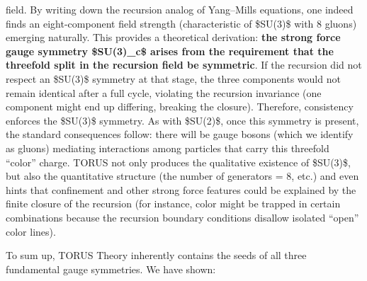 \documentclass[
]{article}
\begin{document}
{\begin{itemize}
  field\hspace{0pt}. By writing down the recursion analog of Yang--Mills
  equations, one indeed finds an eight-component field strength
  (characteristic of \$SU(3)\$ with 8 gluons) emerging
  naturally\hspace{0pt}. This provides a theoretical derivation:
  \textbf{the strong force gauge symmetry \$SU(3)\_c\$ arises from the
  requirement that the threefold split in the recursion field be
  symmetric}. If the recursion did not respect an \$SU(3)\$ symmetry at
  that stage, the three components would not remain identical after a
  full cycle, violating the recursion invariance (one component might
  end up differing, breaking the closure). Therefore, consistency
  enforces the \$SU(3)\$ symmetry\hspace{0pt}. As with \$SU(2)\$, once
  this symmetry is present, the standard consequences follow: there will
  be gauge bosons (which we identify as gluons) mediating interactions
  among particles that carry this threefold ``color'' charge. TORUS not
  only produces the qualitative existence of \$SU(3)\$, but also the
  quantitative structure (the number of generators = 8, etc.) and even
  hints that confinement and other strong force features could be
  explained by the finite closure of the recursion (for instance, color
  might be trapped in certain combinations because the recursion
  boundary conditions disallow isolated ``open'' color lines).
\end{itemize}

To sum up, TORUS Theory inherently contains the seeds of all three
fundamental gauge symmetries. We have shown:

}
\end{document}
